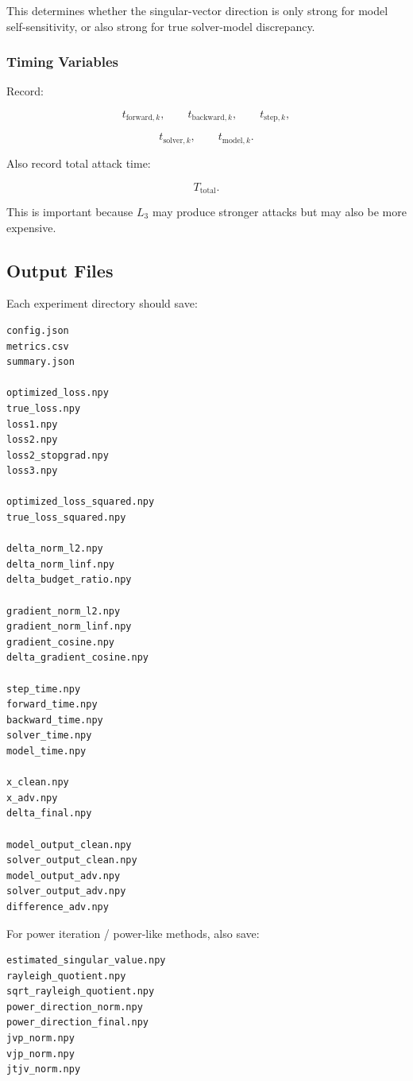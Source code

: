 \documentclass{article}
\begin{document}
This determines whether the singular-vector direction is only strong for model self-sensitivity, or also strong for true solver-model discrepancy.

\subsubsection{Timing Variables}

Record:

\[
t_{\mathrm{forward},k},
\qquad
t_{\mathrm{backward},k},
\qquad
t_{\mathrm{step},k},
\]

\[
t_{\mathrm{solver},k},
\qquad
t_{\mathrm{model},k}.
\]

Also record total attack time:

\[
T_{\mathrm{total}}.
\]

This is important because \(L_3\) may produce stronger attacks but may also be more expensive.

\subsection{Output Files}

Each experiment directory should save:

\begin{verbatim}
config.json
metrics.csv
summary.json

optimized_loss.npy
true_loss.npy
loss1.npy
loss2.npy
loss2_stopgrad.npy
loss3.npy

optimized_loss_squared.npy
true_loss_squared.npy

delta_norm_l2.npy
delta_norm_linf.npy
delta_budget_ratio.npy

gradient_norm_l2.npy
gradient_norm_linf.npy
gradient_cosine.npy
delta_gradient_cosine.npy

step_time.npy
forward_time.npy
backward_time.npy
solver_time.npy
model_time.npy

x_clean.npy
x_adv.npy
delta_final.npy

model_output_clean.npy
solver_output_clean.npy
model_output_adv.npy
solver_output_adv.npy
difference_adv.npy
\end{verbatim}

For power iteration / power-like methods, also save:

\begin{verbatim}
estimated_singular_value.npy
rayleigh_quotient.npy
sqrt_rayleigh_quotient.npy
power_direction_norm.npy
power_direction_final.npy
jvp_norm.npy
vjp_norm.npy
jtjv_norm.npy
\end{verbatim}
\end{document}
